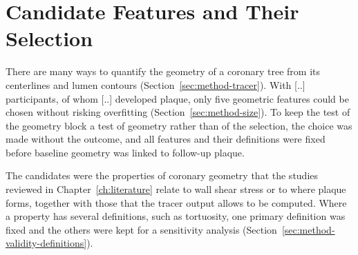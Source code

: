 \providecommand{\clarify}[1]{\textcolor{red}{\textbf{Clarification needed:} #1}}
\section{Candidate Features and Their Selection}
\label{sec:method-selection}

There are many ways to quantify the geometry of a coronary tree from its centerlines and lumen contours (Section~\ref{sec:method-tracer}).
With [..] participants, of whom [..] developed plaque, only five geometric features could be chosen without risking overfitting (Section~\ref{sec:method-size}).
To keep the test of the geometry block a test of geometry rather than of the selection, the choice was made without the outcome, and all features and their definitions were fixed before baseline geometry was linked to follow-up plaque.

The candidates were the properties of coronary geometry that the studies reviewed in Chapter~\ref{ch:literature} relate to wall shear stress or to where plaque forms, together with those that the tracer output allows to be computed.
Where a property has several definitions, such as tortuosity, one primary definition was fixed and the others were kept for a sensitivity analysis (Section~\ref{sec:method-validity-definitions}).

